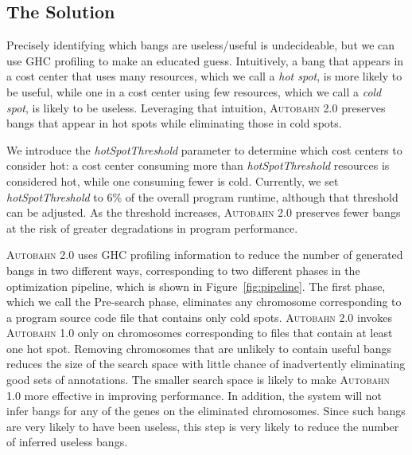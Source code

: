 \documentclass[format=sigplan, review=true]{acmart}
\newcommand{\cut}[1]{}
\newcommand{\figref}[1]{Figure~\ref{#1}}
\newcommand{\hotspot}[0]{hot spot}
\newcommand{\hotspots}[0]{hot spots}
\newcommand{\coldspot}[0]{cold spot}
\newcommand{\coldspots}[0]{cold spots}
\newcommand{\hotspotcost}[0]{\textit{hotSpotThreshold}}
\newcommand{\useful}[0]{useful}
\newcommand{\useless}[0]{useless}
\newcommand{\Ao}[0]{\textsc{Autobahn 1.0}}
\newcommand{\At}[0]{\textsc{Autobahn 2.0}}
\newcommand{\Preopt}[0]{Pre-search}
\begin{document}
\subsection{The Solution}

Precisely identifying which bangs are \useless{}/\useful{} is undecideable, but
we can use GHC profiling to make an educated guess. 
Intuitively, a bang
that appears in a cost center that uses many resources, which we 
call a \textit{\hotspot}, is more likely to be \useful{}, while one in a
cost center using few resources, which we call a \textit{\coldspot}, is likely to
be \useless{}.  Leveraging that intuition, \At{} preserves bangs that appear
in \hotspots{} while eliminating those in \coldspots.

We introduce the \hotspotcost{} parameter to determine
which cost centers to consider hot:  a cost center consuming more
than \hotspotcost{} resources is considered hot, while
one consuming fewer is cold.  
Currently, we set \hotspotcost{} 
to 6\% of the overall program runtime, although that threshold can
be adjusted. As the threshold increases, \At{} preserves fewer bangs
at the risk of greater degradations in program performance.


\cut{
isolate portions
of a chromosome by their individual contributions to program
performance. Cost centers not only break down a chromosome into
smaller portions by source code bindings, but their associated costs
also imply how likely a bang placement will affect program
performance. If executing code at a \hotspot{} occupied a significant
portion of the overall program runtime, then a bang-induced change in
performance at the \hotspot{} will likely significantly affect overall
runtime as well. }

\At{} uses GHC profiling information to reduce the
number of generated bangs in two different ways, corresponding to two
different phases in the optimization pipeline, which is shown in \figref{fig:pipeline}.  The first phase, which
we call
the \Preopt{} phase, eliminates
any chromosome corresponding to a program source code file that
contains only \coldspots{}. \At{} invokes \Ao{} only on chromosomes
corresponding to files that contain at least one \hotspot{}.  Removing
chromosomes that are unlikely to contain \useful{} bangs reduces the
size of the search space with little chance of inadvertently
eliminating good sets of annotations.  The smaller search space is
likely to make \Ao{} more effective in improving performance.  In
addition, the system will not infer bangs for any of the genes on the
eliminated chromosomes.  Since such bangs are very likely to have
been \useless{}, this step is very likely to reduce the number of
inferred \useless{} bangs.
\end{document}
